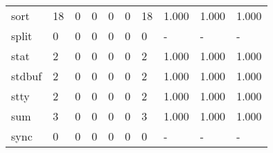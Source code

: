 \begin{longtable}{lp{2.0cm}p{2.0cm}p{2.0cm}p{2.0cm}p{2.0cm}p{2.0cm}p{2.0cm}p{2.0cm}p{2.0cm}}
sort      &                     18 &                                             0 &                                            0 &                                           0 &                                            0 &                                         18 &                                1.000 &                                  1.000 &                                1.000 \\
split     &                      0 &                                             0 &                                            0 &                                           0 &                                            0 &                                          0 &                                    - &                                      - &                                    - \\
stat      &                      2 &                                             0 &                                            0 &                                           0 &                                            0 &                                          2 &                                1.000 &                                  1.000 &                                1.000 \\
stdbuf    &                      2 &                                             0 &                                            0 &                                           0 &                                            0 &                                          2 &                                1.000 &                                  1.000 &                                1.000 \\
stty      &                      2 &                                             0 &                                            0 &                                           0 &                                            0 &                                          2 &                                1.000 &                                  1.000 &                                1.000 \\
sum       &                      3 &                                             0 &                                            0 &                                           0 &                                            0 &                                          3 &                                1.000 &                                  1.000 &                                1.000 \\
sync      &                      0 &                                             0 &                                            0 &                                           0 &                                            0 &                                          0 &                                    - &                                      - &                                    - \\

\end{longtable}

